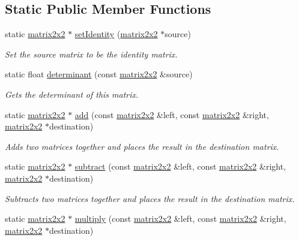 \subsection*{Static Public Member Functions}
\begin{DoxyCompactItemize}
\item 
static \hyperlink{classflounder_1_1matrix2x2}{matrix2x2} $\ast$ \hyperlink{classflounder_1_1matrix2x2_a2e44429f75483d0bf7b01fb7751eddd6}{set\+Identity} (\hyperlink{classflounder_1_1matrix2x2}{matrix2x2} $\ast$source)
\begin{DoxyCompactList}\small\item\em Set the source matrix to be the identity matrix. \end{DoxyCompactList}\item 
static float \hyperlink{classflounder_1_1matrix2x2_aa71186f2af34e6f59a4eb40e5c289ffd}{determinant} (const \hyperlink{classflounder_1_1matrix2x2}{matrix2x2} \&source)
\begin{DoxyCompactList}\small\item\em Gets the determinant of this matrix. \end{DoxyCompactList}\item 
static \hyperlink{classflounder_1_1matrix2x2}{matrix2x2} $\ast$ \hyperlink{classflounder_1_1matrix2x2_a82865bd17dfc15ab8b31f13b814310fe}{add} (const \hyperlink{classflounder_1_1matrix2x2}{matrix2x2} \&left, const \hyperlink{classflounder_1_1matrix2x2}{matrix2x2} \&right, \hyperlink{classflounder_1_1matrix2x2}{matrix2x2} $\ast$destination)
\begin{DoxyCompactList}\small\item\em Adds two matrices together and places the result in the destination matrix. \end{DoxyCompactList}\item 
static \hyperlink{classflounder_1_1matrix2x2}{matrix2x2} $\ast$ \hyperlink{classflounder_1_1matrix2x2_a5372cabfb954d05ed9120e949b972b0a}{subtract} (const \hyperlink{classflounder_1_1matrix2x2}{matrix2x2} \&left, const \hyperlink{classflounder_1_1matrix2x2}{matrix2x2} \&right, \hyperlink{classflounder_1_1matrix2x2}{matrix2x2} $\ast$destination)
\begin{DoxyCompactList}\small\item\em Subtracts two matrices together and places the result in the destination matrix. \end{DoxyCompactList}\item 
static \hyperlink{classflounder_1_1matrix2x2}{matrix2x2} $\ast$ \hyperlink{classflounder_1_1matrix2x2_ab038a15b43141ba85b9779ba3c772579}{multiply} (const \hyperlink{classflounder_1_1matrix2x2}{matrix2x2} \&left, const \hyperlink{classflounder_1_1matrix2x2}{matrix2x2} \&right, \hyperlink{classflounder_1_1matrix2x2}{matrix2x2} $\ast$destination)

\end{DoxyCompactItemize}
